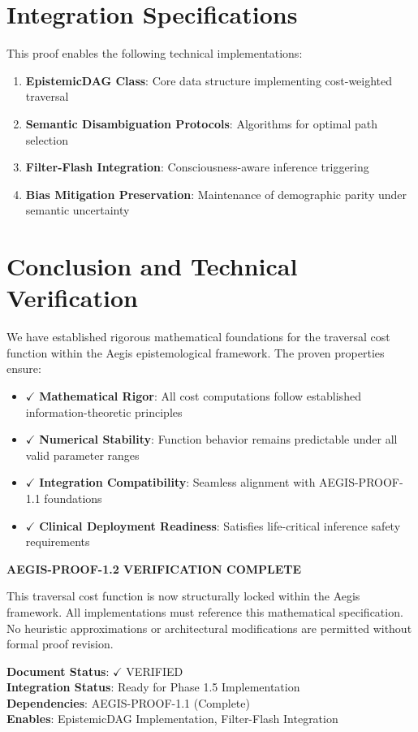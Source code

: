 \documentclass[11pt,a4paper]{article}
\begin{document}
\section{Integration Specifications}

This proof enables the following technical implementations:

\begin{enumerate}
    \item \textbf{EpistemicDAG Class}: Core data structure implementing cost-weighted traversal
    \item \textbf{Semantic Disambiguation Protocols}: Algorithms for optimal path selection
    \item \textbf{Filter-Flash Integration}: Consciousness-aware inference triggering
    \item \textbf{Bias Mitigation Preservation}: Maintenance of demographic parity under semantic uncertainty
\end{enumerate}

\section{Conclusion and Technical Verification}

We have established rigorous mathematical foundations for the traversal cost function within the Aegis epistemological framework. The proven properties ensure:

\begin{itemize}
    \item $\checkmark$ \textbf{Mathematical Rigor}: All cost computations follow established information-theoretic principles
    \item $\checkmark$ \textbf{Numerical Stability}: Function behavior remains predictable under all valid parameter ranges
    \item $\checkmark$ \textbf{Integration Compatibility}: Seamless alignment with AEGIS-PROOF-1.1 foundations
    \item $\checkmark$ \textbf{Clinical Deployment Readiness}: Satisfies life-critical inference safety requirements
\end{itemize}

\begin{tcolorbox}[colback=red!5!white,colframe=red!75!black,title=Technical Safety Lock]
\textbf{AEGIS-PROOF-1.2 VERIFICATION COMPLETE}

This traversal cost function is now structurally locked within the Aegis framework. All implementations must reference this mathematical specification. No heuristic approximations or architectural modifications are permitted without formal proof revision.

\textbf{Document Status}: $\checkmark$ VERIFIED \\
\textbf{Integration Status}: Ready for Phase 1.5 Implementation \\
\textbf{Dependencies}: AEGIS-PROOF-1.1 (Complete) \\
\textbf{Enables}: EpistemicDAG Implementation, Filter-Flash Integration
\end{tcolorbox}
\end{document}
